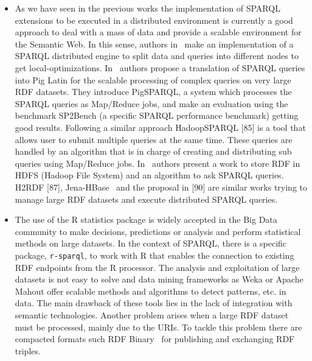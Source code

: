 \begin{itemize}
\item As we have seen in the previous works the implementation of SPARQL 
extensions to be executed in a distributed environment is currently a good 
approach to deal with a mass of data and provide a scalable environment for the 
Semantic Web. In this sense, authors in~\cite{DBLP:journals/pvldb/HuangAR11} make an implementation of a SPARQL 
distributed engine to split data and queries into different nodes to get 
local-optimizations. In~\cite{Schatzle:2011:PMS:1999299.1999303} authors propose a translation of SPARQL queries 
into Pig Latin for the scalable processing of complex queries on very large RDF 
datasets. They introduce PigSPARQL, a system which processes the SPARQL queries 
as Map/Reduce jobs, and make an evaluation using the benchmark SP2Bench (a 
specific SPARQL performance benchmark) getting good results. Following a similar 
approach HadoopSPARQL [85] is a tool that allows user to submit multiple queries 
at the same time. These queries are handled by an algorithm that is in charge of 
creating and distributing sub queries using Map/Reduce jobs. In~\cite{FarhanHusain:2009:SRL:1695659.1695734} authors 
present a work to store RDF in HDFS (Hadoop File System) and an algorithm to ask 
SPARQL queries. H2RDF [87], Jena-HBase~\cite{DBLP:conf/semweb/KhadilkarKTC12} and the proposal in [90] are similar 
works trying to manage large RDF datasets and execute distributed SPARQL queries. 

\item The use of the R statistics package is widely accepted in the Big 
Data community to make decisions, predictions or analysis and perform statistical methods on large datasets. In 
the context of SPARQL, there is a specific package, \texttt{r-sparql}, to work with R that enables the 
connection to existing RDF endpoints from the R processor. The analysis and exploitation of large datasets is not easy to solve and data 
mining frameworks as Weka or Apache Mahout offer scalable methods and algorithms 
to detect patterns, etc. in data. The main drawback of these tools lies in the 
lack of integration with semantic technologies. Another problem arises when a 
large RDF dataset must be processed, mainly due to the URIs. To tackle this 
problem there are compacted formats such RDF Binary~\cite{DBLP:journals/ws/FernandezMGPA13} for publishing and exchanging RDF triples.



\end{itemize}
